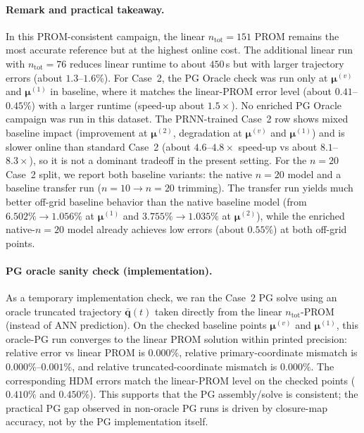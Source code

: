\documentclass[11pt]{article}
\begin{document}
\paragraph{Remark and practical takeaway.}
In this PROM-consistent campaign, the linear $n_{\mathrm{tot}}=151$ PROM remains the most accurate reference but at the highest online cost. The additional linear run with $n_{\mathrm{tot}}=76$ reduces linear runtime to about $450$\,s but with larger trajectory errors (about $1.3$--$1.6$\%). For Case~2, the PG Oracle check was run only at $\bm\mu^{(v)}$ and $\bm\mu^{(1)}$ in baseline, where it matches the linear-PROM error level (about $0.41$--$0.45$\%) with a larger runtime (speed-up about $1.5\times$). No enriched PG Oracle campaign was run in this dataset. The PRNN-trained Case~2 row shows mixed baseline impact (improvement at $\bm\mu^{(2)}$, degradation at $\bm\mu^{(v)}$ and $\bm\mu^{(1)}$) and is slower online than standard Case~2 (about $4.6$--$4.8\times$ speed-up vs about $8.1$--$8.3\times$), so it is not a dominant tradeoff in the present setting. For the $n=20$ Case~2 split, we report both baseline variants: the native $n=20$ model and a baseline transfer run ($n=10\to n=20$ trimming). The transfer run yields much better off-grid baseline behavior than the native baseline model (from $6.502\%\to1.056\%$ at $\bm\mu^{(1)}$ and $3.755\%\to1.035\%$ at $\bm\mu^{(2)}$), while the enriched native-$n=20$ model already achieves low errors (about $0.55\%$) at both off-grid points.

\paragraph{PG oracle sanity check (implementation).}
As a temporary implementation check, we ran the Case~2 PG solve using an oracle truncated trajectory $\bar{\mathbf q}(t)$ taken directly from the linear $n_{\mathrm{tot}}$-PROM (instead of ANN prediction). On the checked baseline points $\bm\mu^{(v)}$ and $\bm\mu^{(1)}$, this oracle-PG run converges to the linear PROM solution within printed precision: relative error vs linear PROM is $0.000\%$, relative primary-coordinate mismatch is $0.000\%$--$0.001\%$, and relative truncated-coordinate mismatch is $0.000\%$. The corresponding HDM errors match the linear-PROM level on the checked points ($0.410\%$ and $0.450\%$). This supports that the PG assembly/solve is consistent; the practical PG gap observed in non-oracle PG runs is driven by closure-map accuracy, not by the PG implementation itself.
\end{document}
